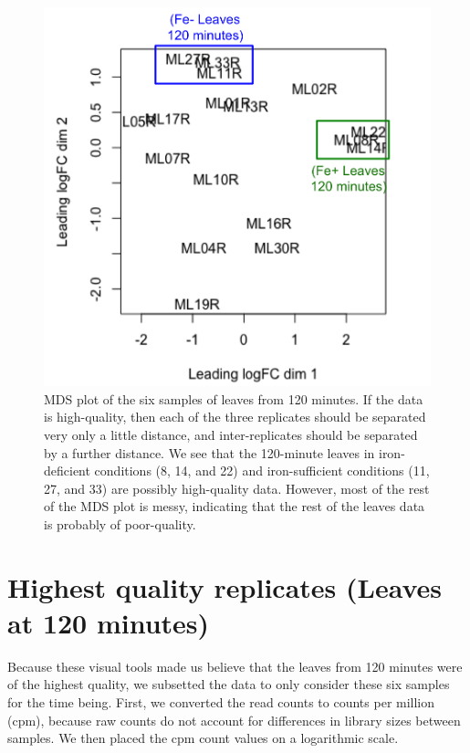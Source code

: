 \documentclass[11pt,a4paper,oldfontcommands,openany]{memoir}
\numberwithin{equation}{section} %
\begin{document}
\begin{figure}[H]
    \begin{framed}
    \centering
    \includegraphics[width=\textwidth]{mdsGroups}
    \end{framed}
    \caption{MDS plot of the six samples of leaves from 120 minutes. If the data is high-quality, then each of the three replicates should be separated very only a little distance, and inter-replicates should be separated by a further distance. We see that the 120-minute leaves in iron-deficient conditions (8, 14, and 22) and iron-sufficient conditions (11, 27, and 33) are possibly high-quality data. However, most of the rest of the MDS plot is messy, indicating that the rest of the leaves data is probably of poor-quality.}
    \label{fig:mdsGroups}
\end{figure}

\section{Highest quality replicates (Leaves at 120 minutes)}

Because these visual tools made us believe that the leaves from 120 minutes were of the highest quality, we subsetted the data to only consider these six samples for the time being. First, we converted the read counts to counts per million (cpm), because raw counts  do not account for differences in library sizes between samples. We then placed the cpm count values on a logarithmic scale.
\end{document}
